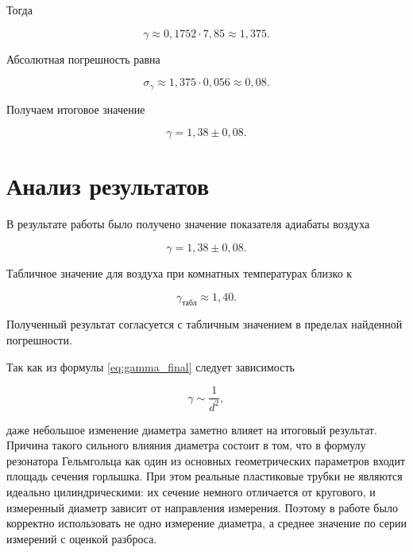 \documentclass[12pt]{extreport}
\begin{document}
	Тогда
	
	\begin{equation*}
		\gamma \approx 0,1752 \cdot 7,85 \approx 1,375.
	\end{equation*}
	
	Абсолютная погрешность равна
	
	\begin{equation*}
		\sigma_{\gamma}
		\approx
		1,375\cdot0,056
		\approx 0,08.
	\end{equation*}
	
	Получаем итоговое значение
	
	\begin{equation*}
		\boxed{\gamma = 1,38 \pm 0,08.}
	\end{equation*}
	
	
	
	\chapter{Анализ результатов}
	
	\hspace{4mm} В результате работы было получено значение показателя адиабаты воздуха
	
	\begin{equation*}
		\gamma = 1,38 \pm 0,08.
	\end{equation*}
	
	Табличное значение для воздуха при комнатных температурах близко к
	
	\begin{equation*}
		\gamma_{\text{табл}} \approx 1,40.
	\end{equation*}
	
	Полученный результат согласуется с табличным значением в пределах найденной погрешности. 
	
	
	Так как из формулы \ref{eq:gamma_final} следует зависимость
	
	\begin{equation*}
		\gamma \sim \frac{1}{d^2},
	\end{equation*}
	
	даже небольшое изменение диаметра заметно влияет на итоговый результат. Причина такого сильного влияния диаметра состоит в том, что в формулу резонатора Гельмгольца как один из основных геометрических параметров входит площадь сечения горлышка. При этом реальные пластиковые трубки не являются идеально цилиндрическими: их сечение немного отличается от кругового, и измеренный диаметр зависит от направления измерения. Поэтому в работе было корректно использовать не одно измерение диаметра, а среднее значение по серии измерений с оценкой разброса.
	
\end{document}
